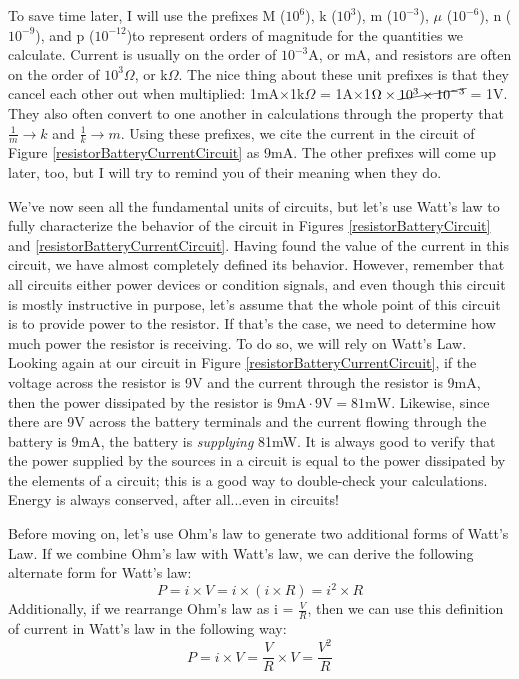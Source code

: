 \par
To save time later, I will use the prefixes M ($10^6$), k ($10^3$), m ($10^{-3}$), $\mu$ ($10^{-6}$), n ($10^{-9}$), and p ($10^{-12}$)to represent orders of magnitude for the quantities we calculate. Current is usually on the order of $10^{-3}$A, or mA, and resistors are often on the order of $10^{3}\Omega$, or k$\Omega$. The nice thing about these unit prefixes is that they cancel each other out when multiplied: 1mA$\times$1k$\Omega$ = 1A$\times$1$\Omega\times\cancel{10^3\times10^{-3}}$ = 1V. They also often convert to one another in calculations through the property that $\frac{1}{m} \rightarrow k$ and $\frac{1}{k} \rightarrow m$. Using these prefixes, we cite the current in the circuit of Figure \ref{resistorBatteryCurrentCircuit} as 9mA. The other prefixes will come up later, too, but I will try to remind you of their meaning when they do.
\par
We've now seen all the fundamental units of circuits, but let's use Watt's law to fully characterize the behavior of the circuit in Figures \ref{resistorBatteryCircuit} and \ref{resistorBatteryCurrentCircuit}. Having found the value of the current in this circuit, we have almost completely defined its behavior. However, remember that all circuits either power devices or condition signals, and even though this circuit is mostly instructive in purpose, let's assume that the whole point of this circuit is to provide power to the resistor. If that's the case, we need to determine how much power the resistor is receiving. To do so, we will rely on Watt's Law. Looking again at our circuit in Figure \ref{resistorBatteryCurrentCircuit}, if the voltage across the resistor is 9V and the current through the resistor is 9mA, then the power dissipated by the resistor is $9\textrm{mA}\cdot9\textrm{V} = 81\textrm{mW}$. Likewise, since there are 9V across the battery terminals and the current flowing through the battery is 9mA, the battery is \textit{supplying} 81mW. It is always good to verify that the power supplied by the sources in a circuit is equal to the power dissipated by the elements of a circuit; this is a good way to double-check your calculations. Energy is always conserved, after all...even in circuits!
\par
Before moving on, let's use Ohm's law to generate two additional forms of Watt's Law. If we combine Ohm's law with Watt's law, we can derive the following alternate form for Watt's law:
$$
P = i\times V = i\times(i\times R) = i^2\times R
$$
Additionally, if we rearrange Ohm's law as i = $\frac{V}{R}$, then we can use this definition of current in Watt's law in the following way:
$$
P = i\times V = \frac{V}{R}\times V = \frac{V^2}{R}
$$

